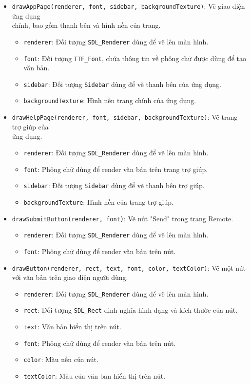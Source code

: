 \begin{itemize}
    \item \texttt{drawAppPage(renderer, font, sidebar, backgroundTexture)}: Vẽ giao diện ứng dụng \\chính, bao gồm thanh bên và hình nền của trang.
    \begin{itemize}
        \item \texttt{renderer}: Đối tượng \texttt{SDL\_Renderer} dùng để vẽ lên màn hình.
        \item \texttt{font}: Đối tượng \texttt{TTF\_Font}, chứa thông tin về phông chữ được dùng để tạo văn bản.
        \item \texttt{sidebar}: Đối tượng \texttt{Sidebar} dùng để vẽ thanh bên của ứng dụng.
        \item \texttt{backgroundTexture}: Hình nền trang chính của ứng dụng.
    \end{itemize}

    \item \texttt{drawHelpPage(renderer, font, sidebar, backgroundTexture)}: Vẽ trang trợ giúp của \\ứng dụng.
    \begin{itemize}
        \item \texttt{renderer}: Đối tượng \texttt{SDL\_Renderer} dùng để vẽ lên màn hình.
        \item \texttt{font}: Phông chữ dùng để render văn bản trên trang trợ giúp.
        \item \texttt{sidebar}: Đối tượng \texttt{Sidebar} dùng để vẽ thanh bên trợ giúp.
        \item \texttt{backgroundTexture}: Hình nền của trang trợ giúp.
    \end{itemize}

    \item \texttt{drawSubmitButton(renderer, font)}: Vẽ nút "Send" trong trang Remote.
    \begin{itemize}
        \item \texttt{renderer}: Đối tượng \texttt{SDL\_Renderer} dùng để vẽ lên màn hình.
        \item \texttt{font}: Phông chữ dùng để render văn bản trên nút.
    \end{itemize}

    \item \texttt{drawButton(renderer, rect, text, font, color, textColor)}: Vẽ một nút với văn bản trên giao diện người dùng.
    \begin{itemize}
        \item \texttt{renderer}: Đối tượng \texttt{SDL\_Renderer} dùng để vẽ lên màn hình.
        \item \texttt{rect}: Đối tượng \texttt{SDL\_Rect} định nghĩa hình dạng và kích thước của nút.
        \item \texttt{text}: Văn bản hiển thị trên nút.
        \item \texttt{font}: Phông chữ dùng để render văn bản trên nút.
        \item \texttt{color}: Màu nền của nút.
        \item \texttt{textColor}: Màu của văn bản hiển thị trên nút.
    \end{itemize}


\end{itemize}

